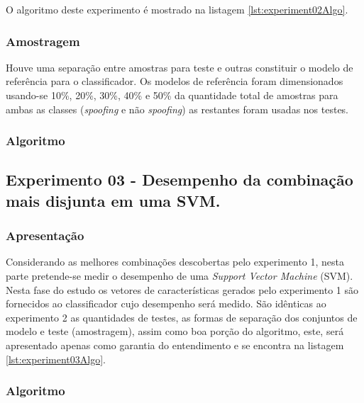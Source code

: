 \begin{myenv}{1.5}
					\par O algoritmo deste experimento é mostrado na listagem \ref{lst:experiment02Algo}.
									
				\subsubsection{Amostragem}
					\par Houve uma separação entre amostras para teste e outras constituir o modelo de referência para o classificador. Os modelos de referência foram dimensionados usando-se 10\%, 20\%, 30\%, 40\% e 50\% da quantidade total de amostras para ambas as classes (\textit{spoofing} e não \textit{spoofing}) as restantes foram usadas nos testes.	
				\subsubsection{Algoritmo}
				

			\subsection{Experimento 03 - Desempenho da combinação mais disjunta em uma SVM.}
			\label{chap:propApproach:sec:Experimento03}
				\subsubsection{Apresentação}
					\par Considerando as melhores combinações descobertas pelo experimento 1, nesta parte pretende-se medir o desempenho de uma \textit{Support Vector Machine} (SVM). Nesta fase do estudo os vetores de características gerados pelo experimento 1 são fornecidos ao classificador cujo desempenho será medido. São idênticas ao experimento 2 as quantidades de testes, as formas de separação dos conjuntos de modelo e teste (amostragem), assim como boa porção do algoritmo, este, será apresentado apenas como garantia do entendimento e se encontra na listagem \ref{lst:experiment03Algo}.

				\subsubsection{Algoritmo}
				
	\end{myenv}